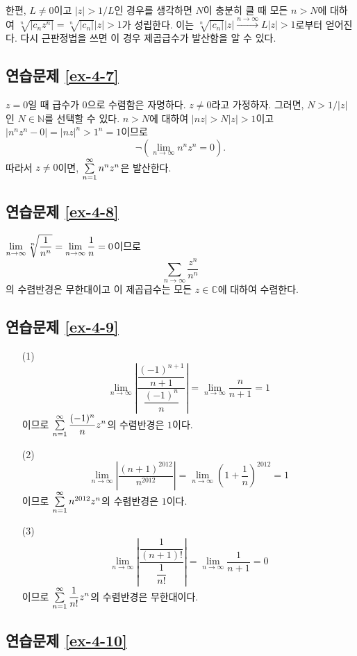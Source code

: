 한편, $L\ne0$이고 $|z|>1/L$인 경우를 생각하면
$N$이 충분히 클 때 모든 $n>N$에 대하여
$\sqrt[n]{|c_nz^n|}  = \sqrt[n]{|c_n|}|z| >1$가 성립한다.
이는 $\sqrt[n]{|c_n|}|z| \stackrel{n\to\infty}{\longrightarrow}L|z|>1$로부터 얻어진다.
다시 근판정법을 쓰면 이 경우 제곱급수가 발산함을 알 수 있다.

\subsection*{연습문제 \ref{ex-4-7}}

$z=0$일 때 급수가 $0$으로 수렴함은 자명하다.
$z\ne 0$라고 가정하자. 그러면, $N>1/|z|$인 
$N\in\mathbb N$를 선택할 수 있다.
$n>N$에 대하여 $|nz|>N|z|>1$이고
$|n^nz^n -0| = |nz|^n >1^n = 1$이므로
\[
\neg \left( \lim_{n\to\infty} n^n z^n = 0 \right).
\]
따라서 $z\ne0$이면, $\sum\limits_{n=1}^\infty n^n z^n$은 발산한다.

\subsection*{연습문제 \ref{ex-4-8}}

$\lim\limits_{n\to\infty} \sqrt[n]{\displaystyle\frac1{n^n}} = \lim\limits_{n\to\infty} \displaystyle\frac1n = 0$이므로
\[
\sum_{n\to\infty} \dfrac{z^n}{n^n}
\]
의 수렴반경은 무한대이고 이 제곱급수는 모든 $z\in\mathbb C$에 대하여 수렴한다.

\subsection*{연습문제 \ref{ex-4-9}}

\begin{itemize}
\item[(1)] 
\[
\lim_{n\to\infty} \left| \dfrac{\dfrac{(-1)^{n+1}}{n+1}}{\dfrac{(-1)^n}n} \right|
= \lim_{n\to\infty} \dfrac n{n+1} = 1
\]
이므로 $\sum\limits_{n=1}^\infty \displaystyle\frac{(-1)^n}n z^n$의 수렴반경은 $1$이다.

\item[(2)] 
\[
\lim_{n\to\infty} \left| \dfrac{(n+1)^{2012}}{n^{2012}} \right|
= \lim_{n\to\infty} \left( 1+ \dfrac1{n} \right)^{2012} = 1
\]
이므로 $\sum\limits_{n=1}^\infty n^ {2012} z^n$의 수렴반경은 $1$이다.

\item[(3)] 
\[
\lim_{n\to\infty} \left| \dfrac{\dfrac{1}{(n+1)!}}{\dfrac1{n!}} \right|
= \lim_{n\to\infty} \dfrac1{n+1} = 0
\]
이므로 $\sum\limits_{n=1}^\infty \displaystyle\frac1{n!}z^n$의 수렴반경은 무한대이다.
\end{itemize}

\subsection*{연습문제 \ref{ex-4-10}}

